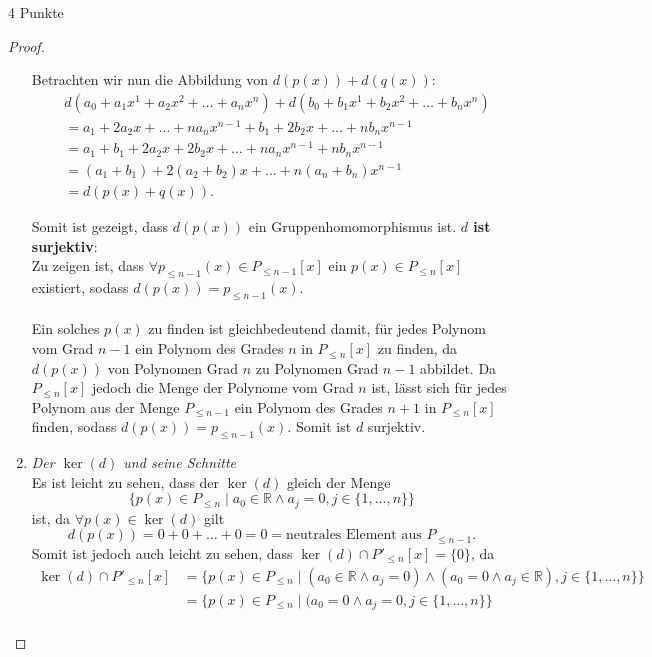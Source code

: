 \documentclass{../problemset}
\begin{document}
\begin{problem}{4 Punkte}
\begin{proof}
\begin{enumerate}
		      Betrachten wir nun die Abbildung von $d(p(x)) + d(q(x))$:
		      \begin{align}
			       & d(a_0 + a_1x^1 + a_2x^2 + \ldots + a_nx^n) + d(b_0 + b_1x^1 + b_2x^2 + \ldots + b_nx^n) \\
			       & = a_1 + 2a_2x + \ldots + na_nx^{n-1} + b_1 + 2b_2x + \ldots + nb_nx^{n-1}               \\
			       & = a_1 + b_1 + 2a_2x + 2b_2x + \ldots + na_nx^{n-1} + nb_nx^{n-1}                        \\
			       & = (a_1 + b_1) + 2(a_2 + b_2)x + \ldots + n(a_n+b_n)x^{n-1}                              \\
			       & = d(p(x) + q(x)).
		      \end{align}

		      Somit ist gezeigt, dass $d(p(x))$ ein Gruppenhomomorphismus ist.
		      \checkmark
		      \textbf{$d$ ist surjektiv}: \\
		      Zu zeigen ist, dass $\forall p_{\le n-1}(x) \in P_{\le n-1}[x]$ ein $p(x) \in P_{\le n}[x]$ existiert, sodass $d(p(x)) = p_{\le n-1}(x)$.
		      \\\\
		      Ein solches $p(x)$ zu finden ist gleichbedeutend damit, für jedes Polynom vom Grad $n-1$ ein Polynom des Grades $n$ in $P_{\le n}[x]$ zu finden,
		      da $d(p(x))$ von Polynomen Grad $n$ zu Polynomen Grad $n-1$ abbildet.
		      Da $P_{\le n}[x]$ jedoch die Menge der Polynome vom Grad $n$ ist,
		      lässt sich für jedes Polynom aus der Menge $P_{\le n - 1}$ ein Polynom des Grades $n+1$ in $P_{\le n}[x]$ finden, sodass $d(p(x)) = p_{\le n -1}(x)$.
		      Somit ist $d$ surjektiv.
		      \checkmark
		\item \textit{Der $\ker(d)$ und seine Schnitte} \\
		      Es ist leicht zu sehen, dass der $\ker(d)$ gleich der Menge
		      \[
			      \{p(x) \in P_{\le n} \mid a_0 \in \mathbb{R} \land a_j = 0, j \in \{1, \ldots, n\}\}
		      \]
		      ist, da $\forall p(x) \in \ker(d)$ gilt
		      \[
			      d(p(x)) = 0 + 0 + \ldots + 0 = 0 = \text{neutrales Element aus } P_{\le n-1}.
		      \]
		      Somit ist jedoch auch leicht zu sehen, dass $\ker(d) \cap P'_{\le n}[x] = \{0\}$, da
		      \begin{align}
			      \ker(d) \cap P'_{\le n}[x] & = \{p(x) \in P_{\le n} \mid (a_0 \in \mathbb{R} \land a_j = 0) \land (a_0 = 0 \land a_j \in \mathbb{R}), j \in \{1, \ldots, n\}\} \\
			                                 & = \{p(x) \in P_{\le n} \mid (a_0 = 0 \land a_j = 0, j \in \{1, \ldots, n\}\}                                                      \\

\end{align}
\end{enumerate}
\end{proof}
\end{problem}
\end{document}
